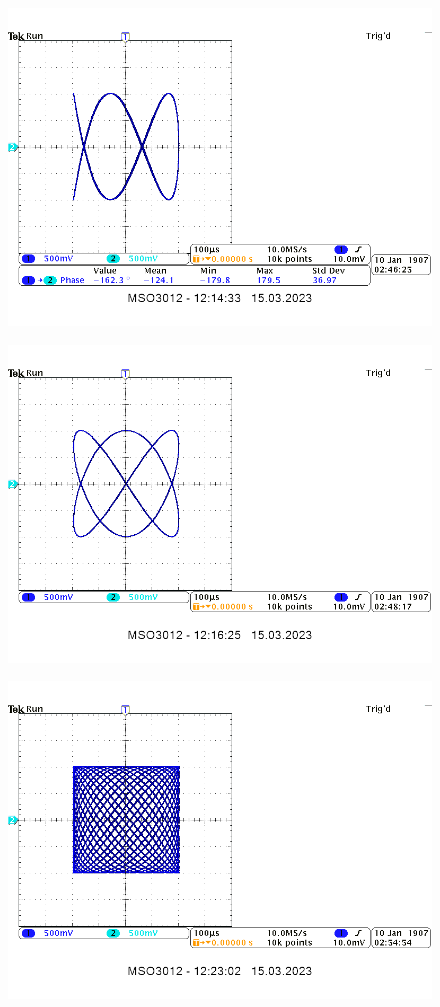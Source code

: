 \documentclass[14pt, table]{extarticle}
\begin{document}
\begin{figure}[H]
\includegraphics[scale=0.7]{A7}
\centering
\end{figure}

\begin{figure}[H]
\includegraphics[scale=0.7]{A8}
\centering
\end{figure}

\begin{figure}[H]
\includegraphics[scale=0.7]{A10}
\centering
\end{figure}
\end{document}
